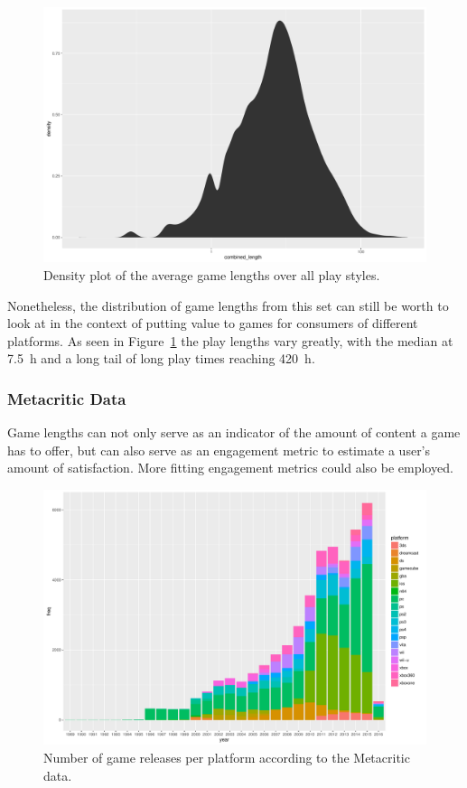 \begin{figure}[!t]
	\centering
	\includegraphics[width=1.0\columnwidth]{images/gamelengths-density.pdf}
	\caption{Density plot of the average game lengths over all play styles.}
\label{fig:gamelengths-density}
\end{figure}

Nonetheless, the distribution of game lengths from this set can still be worth to look at in the context of putting value to games for consumers of different platforms. As seen in Figure~\ref{fig:gamelengths-density} the play lengths vary greatly, with the median at \SI{7.5}{\hour} and a long tail of long play times reaching \SI{420}{\hour}.


\subsubsection{Metacritic Data}

Game lengths can not only serve as an indicator of the amount of content a game has to offer, but can also serve as an engagement metric to estimate a user's amount of satisfaction. More fitting engagement metrics could also be employed.


\begin{figure}[!t]
	\centering
	\includegraphics[width=1.0\columnwidth]{images/releases-per-year.pdf}
	\caption{Number of game releases per platform according to the Metacritic data.}
\label{fig:releases-per-year}
\end{figure}




